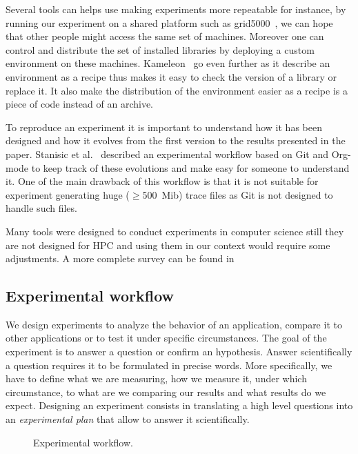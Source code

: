 Several tools can helps use making experiments more repeatable for instance, by running our experiment on a shared platform such as grid5000~\cite{Cappello05Grid5000}, we can hope that other people might access the same set of machines.
Moreover one can control and distribute the set of installed libraries by deploying a custom environment on these machines.
\gls{Kameleon}~\cite{Ruiz15Reconstructable} go even further as it describe an environment as a recipe thus makes it easy to check the version of a library or replace it.
It also make the distribution of the environment easier as a recipe is a piece of code instead of an archive.

To reproduce an experiment it is important to understand how it has been designed and how it evolves from the first version to the results presented in the paper.
Stanisic et al.~\cite[Chapter~4, p31-44]{Stanisic15Reproducible} described an experimental workflow based on \gls{Git} and \gls{Org-mode} to keep track of these evolutions and make easy for someone to understand it.
One of the main drawback of this workflow is that it is not suitable for experiment generating huge ($\ge$\SI{500}{Mib}) trace files as \gls{Git} is not designed to handle such files.

Many tools were designed to conduct experiments in computer science still they are not designed for \gls{HPC} and using them in our context would require some adjustments.
A more complete survey can be found in~\cite[Chapter~3, p17-19]{Stanisic15Reproducible}

\subsection{Experimental workflow}

We design experiments to analyze the behavior of an application, compare it to other applications or to test it under specific circumstances.
The goal of the experiment is to answer a question or confirm an hypothesis.
Answer scientifically a question requires it to be formulated in precise words.
More specifically, we have to define what we are measuring, how we measure it, under which circumstance, to what are we comparing our results and what results do we expect.
Designing an experiment consists in translating a high level questions into an \emph{experimental plan} that allow to answer it scientifically.

\begin{figure}[htb]
    \centering
    
    \caption{Experimental workflow.}
    \label{fig:exp-pipeline}
\end{figure}

